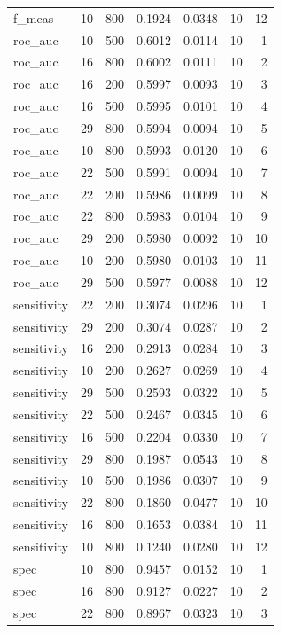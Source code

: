 \documentclass[
  11pt,
  a4paper,
]{article}
\begin{document}
\begin{longtable}[t]{>{\raggedright\arraybackslash}p{2.4cm}rrrrrr}
f\_meas & 10 & 800 & 0.1924 & 0.0348 & 10 & 12\\
roc\_auc & 10 & 500 & 0.6012 & 0.0114 & 10 & 1\\
\addlinespace
roc\_auc & 16 & 800 & 0.6002 & 0.0111 & 10 & 2\\
roc\_auc & 16 & 200 & 0.5997 & 0.0093 & 10 & 3\\
roc\_auc & 16 & 500 & 0.5995 & 0.0101 & 10 & 4\\
roc\_auc & 29 & 800 & 0.5994 & 0.0094 & 10 & 5\\
roc\_auc & 10 & 800 & 0.5993 & 0.0120 & 10 & 6\\
\addlinespace
roc\_auc & 22 & 500 & 0.5991 & 0.0094 & 10 & 7\\
roc\_auc & 22 & 200 & 0.5986 & 0.0099 & 10 & 8\\
roc\_auc & 22 & 800 & 0.5983 & 0.0104 & 10 & 9\\
roc\_auc & 29 & 200 & 0.5980 & 0.0092 & 10 & 10\\
roc\_auc & 10 & 200 & 0.5980 & 0.0103 & 10 & 11\\
\addlinespace
roc\_auc & 29 & 500 & 0.5977 & 0.0088 & 10 & 12\\
sensitivity & 22 & 200 & 0.3074 & 0.0296 & 10 & 1\\
sensitivity & 29 & 200 & 0.3074 & 0.0287 & 10 & 2\\
sensitivity & 16 & 200 & 0.2913 & 0.0284 & 10 & 3\\
sensitivity & 10 & 200 & 0.2627 & 0.0269 & 10 & 4\\
\addlinespace
sensitivity & 29 & 500 & 0.2593 & 0.0322 & 10 & 5\\
sensitivity & 22 & 500 & 0.2467 & 0.0345 & 10 & 6\\
sensitivity & 16 & 500 & 0.2204 & 0.0330 & 10 & 7\\
sensitivity & 29 & 800 & 0.1987 & 0.0543 & 10 & 8\\
sensitivity & 10 & 500 & 0.1986 & 0.0307 & 10 & 9\\
\addlinespace
sensitivity & 22 & 800 & 0.1860 & 0.0477 & 10 & 10\\
sensitivity & 16 & 800 & 0.1653 & 0.0384 & 10 & 11\\
sensitivity & 10 & 800 & 0.1240 & 0.0280 & 10 & 12\\
spec & 10 & 800 & 0.9457 & 0.0152 & 10 & 1\\
spec & 16 & 800 & 0.9127 & 0.0227 & 10 & 2\\
\addlinespace
spec & 22 & 800 & 0.8967 & 0.0323 & 10 & 3\\

\end{longtable}
\end{document}
